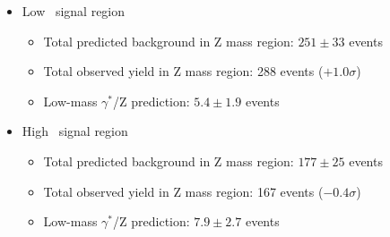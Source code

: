 \begin{itemize}
\item Low \MET\ signal region
\begin{itemize}
  \item Total predicted background in Z mass region: $251\pm33$ events
  \item Total observed yield in Z mass region: 288 events ($+1.0\sigma$)
  \item Low-mass $\gamma^*$/Z prediction: $5.4\pm1.9$ events
\end{itemize}
\item High \MET\ signal region
\begin{itemize}
  \item Total predicted background in Z mass region: $177\pm25$ events
  \item Total observed yield in Z mass region: 167 events ($-0.4\sigma$)
  \item Low-mass $\gamma^*$/Z prediction: $7.9\pm2.7$ events
\end{itemize}
\end{itemize}

\clearpage

